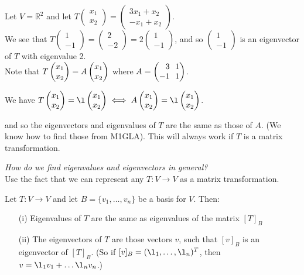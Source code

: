 \documentclass[twoside]{scrartcl}
\begin{document}
\begin{example} Let $V = \mathbb{R}^2$ and let $T\begin{pmatrix}
x_1 \\ x_2
\end{pmatrix} = \begin{pmatrix}
 3x_1 + x_2 \\ -x_1 + x_2
 \end{pmatrix}.$\\
 
 \noindent We see that $T\left(\begin{smallmatrix} 1\\-1 \end{smallmatrix}\right) = \left(\begin{smallmatrix}2\\-2 \end{smallmatrix}\right)  = 2\left(\begin{smallmatrix}1\\-1 \end{smallmatrix}\right) $, and so $\left(\begin{smallmatrix}1\\-1 \end{smallmatrix}\right) $
 is an eigenvector of $T$ with eigenvalue 2. \\
 
 Note that  $T\Spvek{x_1;x_2} = A\Spvek{x_1;x_2}$ where $A = \Spvek{3 ~~ 1; -1 ~~ 1}$. \\ \vspace*{10pt}
 
 We have $T\Spvek{x_1;x_2} = \l\Spvek{x_1;x_2} \iff A\Spvek{x_1;x_2} = \l\Spvek{x_1;x_2}$.\vspace*{5pt}
 
and so the eigenvectors and eigenvalues of $T$ are the same as those of $A$. (We know how to find those from M1GLA). This will always work if $T$ is a matrix transformation.
\end{example}
 
 \emph{How do we find eigenvalues and eigenvectors in general?}\\
 Use the fact that we can represent any $T: V \to V$ as a matrix transformation.\\
 
 \begin{proposition} Let $T: V \to V$ and let $B = \{v_1,\dots,v_n\}$ be a basis for $V$. Then:
 \begin{enumerate}
 \item[(i)] Eigenvalues of $T$ are the same as eigenvalues of the matrix $[T]_B$
 \item[(ii)] The eigenvectors of $T$ are those vectors $v$, such that $[v]_B$ is an eigenvector of $[T]_B$.  (So if $[v]_B = (\l_1,\dots,\l_n)^T$, then $v = \l_1v_1 + \dots \l_nv_n$.) 
 \end{enumerate}
 \end{proposition}
\end{document}
